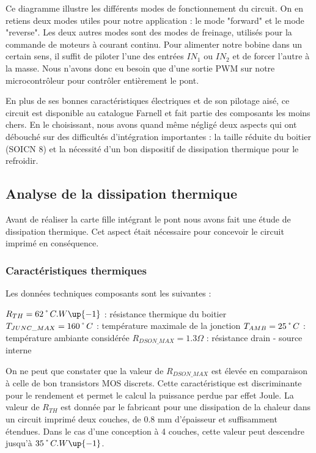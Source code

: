 \documentclass[11pt, french]{article} %
\begin{document}
Ce diagramme illustre les différents modes de fonctionnement du circuit. On en retiens deux modes utiles pour notre application : le mode "forward" et le mode "reverse". Les deux autres modes sont des modes de freinage, utilisés pour la commande de moteurs à courant continu. Pour alimenter notre bobine dans un certain sens, il suffit de piloter l'une des entrées $ IN_1 $ ou $ IN_2 $ et de forcer l'autre à la masse. Nous n'avons donc eu besoin que d'une sortie PWM sur notre microcontrôleur pour contrôler entièrement le pont.

\medskip
En plus de ses bonnes caractéristiques électriques et de son pilotage aisé, ce circuit est disponible au catalogue Farnell et fait partie des composants les moins chers. En le choisissant, nous avons quand même négligé deux aspects qui ont débouché sur des difficultés d'intégration importantes : la taille réduite du boitier (SOICN 8) et la nécessité d'un bon dispositif de dissipation thermique pour le refroidir.

\subsection{Analyse de la dissipation thermique}
Avant de réaliser la carte fille intégrant le pont nous avons fait une étude de dissipation thermique. Cet aspect était nécessaire pour concevoir le circuit imprimé en conséquence.

\subsubsection{Caractéristiques thermiques}
Les données techniques composants sont les suivantes :

\medskip
\noindent
$ R_{TH} = 62 \char23C.W\up{-1} $ : résistance thermique du boitier \newline
$ T_{JUNC\_{MAX}} = 160 \char23C $ : température maximale de la jonction \newline
$ T_{AMB} = 25\char23C $ : température ambiante considérée \newline
$ R_{DSON\_{MAX}} = 1.3 \Omega $ : résistance drain - source interne \newline
\noindent

On ne peut que constater que la valeur de $ R_{DSON\_{MAX}} $ est élevée en comparaison à celle de bon transistors MOS discrets. Cette caractéristique est discriminante pour le rendement et permet le calcul la puissance perdue par effet Joule. La valeur de $R_{TH}$ est donnée par le fabricant pour une dissipation de la chaleur dans un circuit imprimé deux couches, de 0.8 mm d'épaisseur et suffisamment étendues. Dans le cas d'une conception à 4 couches, cette valeur peut descendre jusqu'à $ 35 \char23C.W\up{-1} $.
\end{document}
